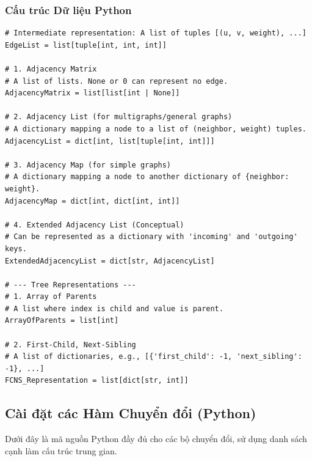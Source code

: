 \documentclass[a4paper,12pt]{article}
\begin{document}
\subsubsection{Cấu trúc Dữ liệu Python}
\begin{lstlisting}[style=pythonstyle, caption={Định nghĩa các cấu trúc dữ liệu biểu diễn đồ thị trong Python.}, label={lst:py_structures_4}]
# Intermediate representation: A list of tuples [(u, v, weight), ...]
EdgeList = list[tuple[int, int, int]]

# 1. Adjacency Matrix
# A list of lists. None or 0 can represent no edge.
AdjacencyMatrix = list[list[int | None]]

# 2. Adjacency List (for multigraphs/general graphs)
# A dictionary mapping a node to a list of (neighbor, weight) tuples.
AdjacencyList = dict[int, list[tuple[int, int]]]

# 3. Adjacency Map (for simple graphs)
# A dictionary mapping a node to another dictionary of {neighbor: weight}.
AdjacencyMap = dict[int, dict[int, int]]

# 4. Extended Adjacency List (Conceptual)
# Can be represented as a dictionary with 'incoming' and 'outgoing' keys.
ExtendedAdjacencyList = dict[str, AdjacencyList]

# --- Tree Representations ---
# 1. Array of Parents
# A list where index is child and value is parent.
ArrayOfParents = list[int]

# 2. First-Child, Next-Sibling
# A list of dictionaries, e.g., [{'first_child': -1, 'next_sibling': -1}, ...]
FCNS_Representation = list[dict[str, int]]
\end{lstlisting}

\subsection{Cài đặt các Hàm Chuyển đổi (Python)}
Dưới đây là mã nguồn Python đầy đủ cho các bộ chuyển đổi, sử dụng danh sách cạnh làm cấu trúc trung gian.
\end{document}
